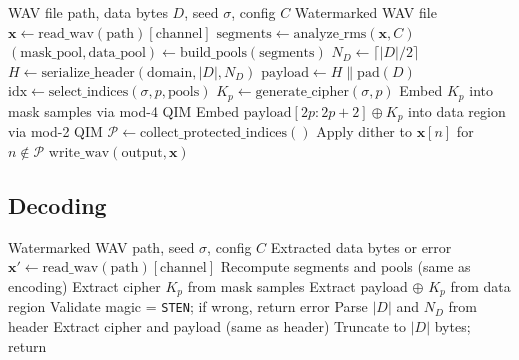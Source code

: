 \documentclass[11pt,a4paper]{article}
\newcommand{\xor}{\oplus}
\begin{document}
\begin{algorithm}[H]
\caption{StenoWav Encoding Pipeline}
\begin{algorithmic}[1]
\Require WAV file path, data bytes $D$, seed $\sigma$, config $C$
\Ensure Watermarked WAV file
\State $\mathbf{x} \gets \text{read\_wav}(\text{path})[\text{channel}]$
\State $\text{segments} \gets \text{analyze\_rms}(\mathbf{x}, C)$
\State $(\text{mask\_pool}, \text{data\_pool}) \gets \text{build\_pools}(\text{segments})$
\State $N_D \gets \lceil |D| / 2 \rceil$ 
\State $H \gets \text{serialize\_header}(\text{domain}, |D|, N_D)$ 
\State $\text{payload} \gets H \| \text{pad}(D)$
    \State $\text{idx} \gets \text{select\_indices}(\sigma, p, \text{pools})$
    \State $K_p \gets \text{generate\_cipher}(\sigma, p)$
    \State Embed $K_p$ into mask samples via mod-4 QIM
    \State Embed $\text{payload}[2p:2p{+}2] \xor K_p$ into data region via mod-2 QIM
\EndFor
{}
    \State $\mathcal{P} \gets \text{collect\_protected\_indices}()$
    \State Apply dither to $\mathbf{x}[n]$ for $n \notin \mathcal{P}$
\EndIf
\State $\text{write\_wav}(\text{output}, \mathbf{x})$
\end{algorithmic}
\end{algorithm}

\subsection{Decoding}

\begin{algorithm}[H]
\caption{StenoWav Decoding Pipeline}
\begin{algorithmic}[1]
\Require Watermarked WAV path, seed $\sigma$, config $C$
\Ensure Extracted data bytes or error
\State $\mathbf{x}' \gets \text{read\_wav}(\text{path})[\text{channel}]$
\State Recompute segments and pools (same as encoding)
 
    \State Extract cipher $K_p$ from mask samples
    \State Extract payload $\xor$ $K_p$ from data region
\EndFor
\State Validate magic = \texttt{STEN}; if wrong, return error
\State Parse $|D|$ and $N_D$ from header
 
    \State Extract cipher and payload (same as header)
\EndFor
\State Truncate to $|D|$ bytes; return
\end{algorithmic}
\end{algorithm}


\end{document}
